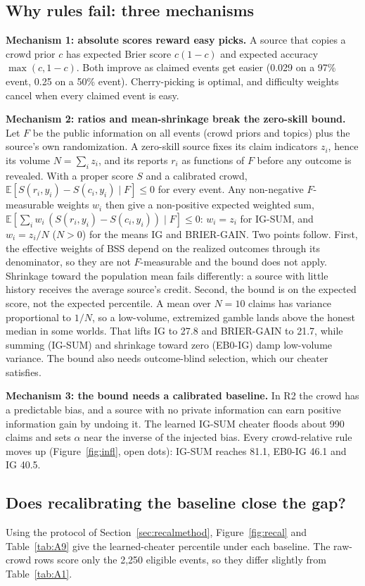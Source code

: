 \documentclass[10pt]{article}
\begin{document}
\subsection{Why rules fail: three mechanisms}
\label{sec:mech}
\textbf{Mechanism 1: absolute scores reward easy picks.} A source that copies a crowd prior $c$ has expected Brier score $c(1-c)$ and expected accuracy $\max(c,1-c)$. Both improve as claimed events get easier (0.029 on a 97\% event, 0.25 on a 50\% event). Cherry-picking is optimal, and difficulty weights cancel when every claimed event is easy.

\textbf{Mechanism 2: ratios and mean-shrinkage break the zero-skill bound.} Let $F$ be the public information on all events (crowd priors and topics) plus the source's own randomization. A zero-skill source fixes its claim indicators $z_i$, hence its volume $N=\sum_i z_i$, and its reports $r_i$ as functions of $F$ before any outcome is revealed. With a proper score $S$ and a calibrated crowd, $\mathbb{E}[S(r_i,y_i)-S(c_i,y_i)\mid F]\le 0$ for every event. Any non-negative $F$-measurable weights $w_i$ then give a non-positive expected weighted sum, $\mathbb{E}[\sum_i w_i\,(S(r_i,y_i)-S(c_i,y_i))\mid F]\le 0$: $w_i=z_i$ for IG-SUM, and $w_i=z_i/N$ ($N>0$) for the means IG and BRIER-GAIN. Two points follow. First, the effective weights of BSS depend on the realized outcomes through its denominator, so they are not $F$-measurable and the bound does not apply. Shrinkage toward the population mean fails differently: a source with little history receives the average source's credit. Second, the bound is on the expected score, not the expected percentile. A mean over $N=10$ claims has variance proportional to $1/N$, so a low-volume, extremized gamble lands above the honest median in some worlds. That lifts IG to 27.8 and BRIER-GAIN to 21.7, while summing (IG-SUM) and shrinkage toward zero (EB0-IG) damp low-volume variance. The bound also needs outcome-blind selection, which our cheater satisfies.

\textbf{Mechanism 3: the bound needs a calibrated baseline.} In R2 the crowd has a predictable bias, and a source with no private information can earn positive information gain by undoing it. The learned IG-SUM cheater floods about 990 claims and sets $\alpha$ near the inverse of the injected bias. Every crowd-relative rule moves up (Figure~\ref{fig:infl}, open dots): IG-SUM reaches 81.1, EB0-IG 46.1 and IG 40.5.

\subsection{Does recalibrating the baseline close the gap?}
\label{sec:recal}
Using the protocol of Section~\ref{sec:recalmethod}, Figure~\ref{fig:recal} and Table~\ref{tab:A9} give the learned-cheater percentile under each baseline. The raw-crowd rows score only the 2,250 eligible events, so they differ slightly from Table~\ref{tab:A1}.
\end{document}
